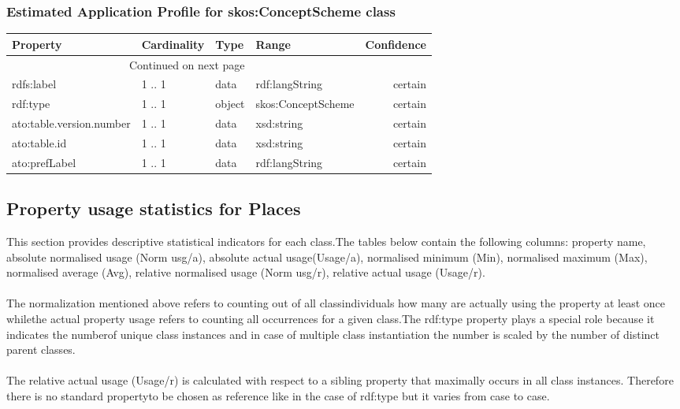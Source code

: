 \documentclass[10pt,a4paper,titlepage,final]{article}
\begin{document}
\subsubsection{Estimated Application Profile for skos:ConceptScheme class}
\begin{tabularx}{\textwidth}{lllXr}
\toprule
                 Property & Cardinality &    Type &               Range & Confidence \\
\midrule
\endhead
\midrule
\multicolumn{3}{r}{{Continued on next page}} \\
\midrule
\endfoot

\bottomrule
\endlastfoot
               rdfs:label &      1 .. 1 &    data &      rdf:langString &    certain \\
                 rdf:type &      1 .. 1 &  object &  skos:ConceptScheme &    certain \\
 ato:table.version.number &      1 .. 1 &    data &          xsd:string &    certain \\
             ato:table.id &      1 .. 1 &    data &          xsd:string &    certain \\
            ato:prefLabel &      1 .. 1 &    data &      rdf:langString &    certain \\
\end{tabularx}


\subsection{Property usage statistics for Places}
This section provides descriptive statistical indicators for each class.The tables below contain the following columns: property name, absolute normalised usage (Norm usg/a), absolute actual usage(Usage/a), normalised minimum (Min), normalised maximum (Max), normalised average (Avg), relative normalised usage (Norm usg/r), relative actual usage (Usage/r).\\\\The normalization mentioned above refers to counting out of all classindividuals how many are actually using the property at least once whilethe actual property usage refers to counting all occurrences for a given class.The rdf:type property plays a special role because it indicates the numberof unique class instances and in case of multiple class instantiation the number is scaled by the  number of distinct parent classes. \\\\The relative actual usage (Usage/r) is calculated with respect to a sibling property that maximally occurs in all class instances. Therefore there is no standard propertyto be chosen as reference like in the case of rdf:type but it varies from case to case.
\end{document}
